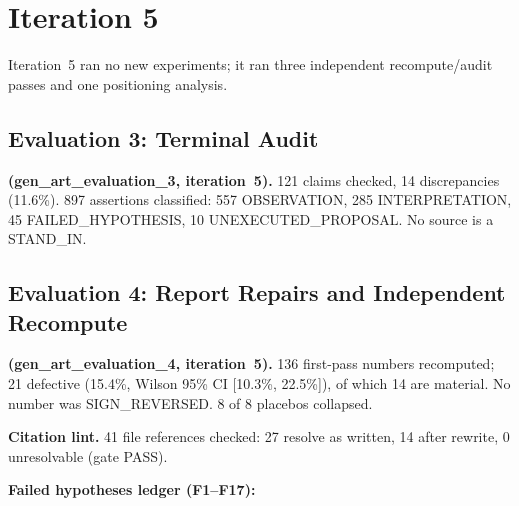 \documentclass[11pt,letterpaper]{article}
\begin{document}
\section{Iteration 5}\label{sec:iter5}

Iteration~5 ran no new experiments; it ran three independent recompute/audit passes and one positioning analysis.


\subsection{Evaluation 3: Terminal Audit}\label{sec:eval3}

\textbf{(gen\_art\_evaluation\_3, iteration~5).} 121 claims checked, 14 discrepancies (11.6\%). 897 assertions classified: 557 OBSERVATION, 285 INTERPRETATION, 45 FAILED\_HYPOTHESIS, 10 UNEXECUTED\_PROPOSAL. No source is a STAND\_IN.


\subsection{Evaluation 4: Report Repairs and Independent Recompute}\label{sec:eval4}

\textbf{(gen\_art\_evaluation\_4, iteration~5).} 136 first-pass numbers recomputed; 21 defective (15.4\%, Wilson 95\% CI [10.3\%, 22.5\%]), of which 14 are material. No number was SIGN\_REVERSED. 8 of 8 placebos collapsed.

\textbf{Citation lint.} 41 file references checked: 27 resolve as written, 14 after rewrite, 0 unresolvable (gate PASS).

\textbf{Failed hypotheses ledger (F1--F17):}
\end{document}

